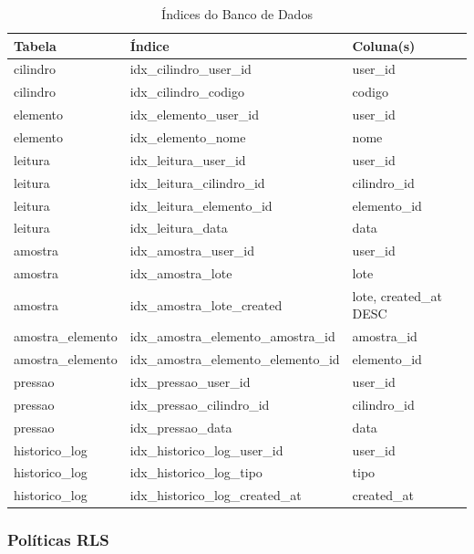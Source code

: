 \documentclass[12pt,a4paper]{article}
\begin{document}
\begin{table}[h!]
\centering
\caption{Índices do Banco de Dados}
\label{tab:indices}
\begin{tabular}{@{}lll@{}}
\toprule
\textbf{Tabela} & \textbf{Índice} & \textbf{Coluna(s)} \\
\midrule
cilindro & idx\_cilindro\_user\_id & user\_id \\
cilindro & idx\_cilindro\_codigo & codigo \\
elemento & idx\_elemento\_user\_id & user\_id \\
elemento & idx\_elemento\_nome & nome \\
leitura & idx\_leitura\_user\_id & user\_id \\
leitura & idx\_leitura\_cilindro\_id & cilindro\_id \\
leitura & idx\_leitura\_elemento\_id & elemento\_id \\
leitura & idx\_leitura\_data & data \\
amostra & idx\_amostra\_user\_id & user\_id \\
amostra & idx\_amostra\_lote & lote \\
amostra & idx\_amostra\_lote\_created & lote, created\_at DESC \\
amostra\_elemento & idx\_amostra\_elemento\_amostra\_id & amostra\_id \\
amostra\_elemento & idx\_amostra\_elemento\_elemento\_id & elemento\_id \\
pressao & idx\_pressao\_user\_id & user\_id \\
pressao & idx\_pressao\_cilindro\_id & cilindro\_id \\
pressao & idx\_pressao\_data & data \\
historico\_log & idx\_historico\_log\_user\_id & user\_id \\
historico\_log & idx\_historico\_log\_tipo & tipo \\
historico\_log & idx\_historico\_log\_created\_at & created\_at \\
\bottomrule
\end{tabular}
\end{table}

\subsubsection{Políticas RLS}
\end{document}
